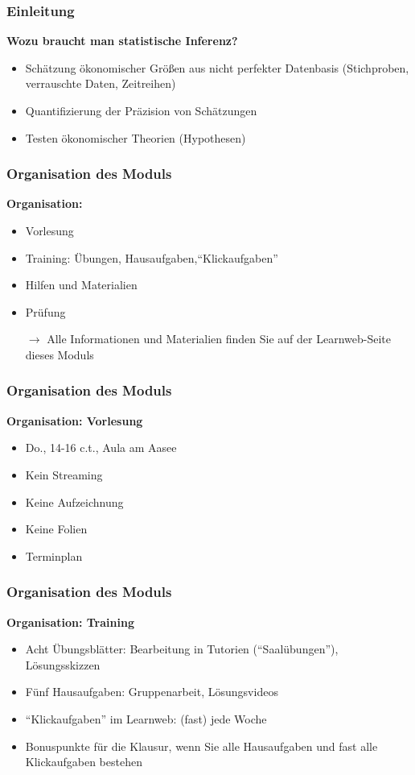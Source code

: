 \documentclass[12pt,show notes]{beamer}
\begin{document}
\begin{frame}
\frametitle{Einleitung}
\textbf{Wozu braucht man statistische Inferenz?}\\\medskip
\begin{itemize}
\item Schätzung ökonomischer Größen aus nicht perfekter Datenbasis (Stichproben, verrauschte Daten, Zeitreihen)
\item Quantifizierung der Präzision von Schätzungen
\item Testen ökonomischer Theorien (Hypothesen)
\end{itemize}
\end{frame}

\begin{frame}
\frametitle{Organisation des Moduls}
\textbf{Organisation:}\medskip
\begin{itemize}
\item Vorlesung
\item Training: Übungen, Hausaufgaben,``Klickaufgaben''
\item Hilfen und Materialien
\item Prüfung\bigskip\pause
\item[$\longrightarrow$]
Alle Informationen und Materialien finden Sie auf der Learnweb-Seite
dieses Moduls
\end{itemize}
\end{frame}

\begin{frame}
\frametitle{Organisation des Moduls}
\textbf{Organisation: Vorlesung}\medskip
\begin{itemize}
\item Do., 14-16 c.t., Aula am Aasee
\item Kein Streaming
\item Keine Aufzeichnung
\item Keine Folien
\item Terminplan
\end{itemize}
\end{frame}

\begin{frame}
\frametitle{Organisation des Moduls}
\textbf{Organisation: Training}\medskip
\begin{itemize}
\item Acht Übungsblätter: Bearbeitung in Tutorien (``Saalübungen''), Lösungsskizzen
\item Fünf Hausaufgaben: Gruppenarbeit, Lösungsvideos
\item ``Klickaufgaben'' im Learnweb: (fast) jede Woche
\item Bonuspunkte für die Klausur, wenn Sie
alle Hausaufgaben und fast alle Klickaufgaben bestehen
\end{itemize}
\end{frame}
\end{document}
